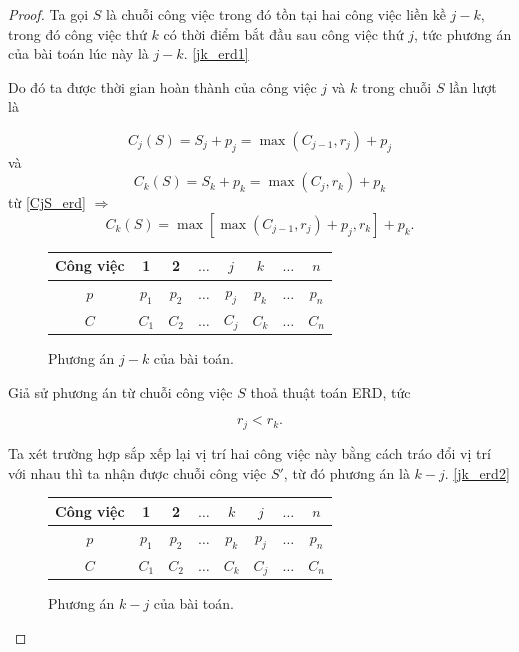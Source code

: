 \begin{proof}
	Ta gọi $S$ là chuỗi công việc trong đó tồn tại hai công việc liền kề $j - k$, trong đó công việc thứ $k$ có thời điểm bắt đầu sau công việc thứ $j$, tức phương án của bài toán lúc này là $j - k$. \eqref{jk_erd1}
	
	Do đó ta được thời gian hoàn thành của công việc $j$ và $k$ trong chuỗi $S$ lần lượt là
	
	\begin{equation} \label{CjS_erd}
		C_j(S) = S_j + p_j = \max ( C_{j-1} , r_j ) + p_j
	\end{equation}
	và
	\begin{equation}
		C_k(S) = S_k + p_k = \max (C_j , r_k ) + p_k
	\end{equation}
	từ \eqref{CjS_erd}
	$\Rightarrow$
	\begin{equation} \label{CkS_erd}
		C_k(S) = \max \left[ \max (C_{j-1} , r_j ) + p_j , r_k \right] + p_k.
	\end{equation}

	\begin{figure}[h!]
		\centering
		 \begin{tabular}{|c | c c c c c c c |} 
		 \hline
		 Công việc & 1 & 2 & $\ldots$ & $j$ & $k$ & $\ldots$ & $n$ \\
		 \hline\hline
		 $p$ & $p_1$ & $p_2$ & $\ldots$ & $p_j$ & $p_k$ & $\ldots$ & $p_n$ \\
		 $C$ & $C_1$ & $C_2$ & $\ldots$ & $C_j$ & $C_k$ & $\ldots$ & $C_n$ \\
		 \hline
		 \end{tabular}
	\caption{\label{jk_erd1}Phương án $j - k$ của bài toán.}
	\end{figure}

	Giả sử phương án từ chuỗi công việc $S$ thoả thuật toán ERD, tức
	
	\begin{equation} \label{rj<rk}
		r_j < r_k.
	\end{equation}

	Ta xét trường hợp sắp xếp lại vị trí hai công việc này bằng cách tráo đổi vị trí với nhau thì ta nhận được chuỗi công việc $S'$, từ đó phương án là $k - j$. \eqref{jk_erd2}

	\begin{figure}[h!]
		\centering
		 \begin{tabular}{|c | c c c c c c c |} 
		 \hline
		 Công việc & 1 & 2 & $\ldots$ & $k$ & $j$ & $\ldots$ & $n$ \\
		 \hline\hline
		 $p$ & $p_1$ & $p_2$ & $\ldots$ & $p_k$ & $p_j$ & $\ldots$ & $p_n$ \\
		 $C$ & $C_1$ & $C_2$ & $\ldots$ & $C_k$ & $C_j$ & $\ldots$ & $C_n$ \\
		 \hline
		 \end{tabular}
	\caption{\label{jk_erd2}Phương án $k - j$ của bài toán.}
	\end{figure}


\end{proof}
